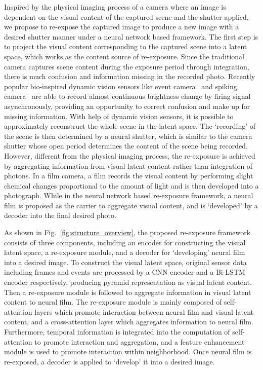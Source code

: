 \documentclass[10pt,twocolumn,letterpaper]{article}
\begin{document}
Inspired by the physical imaging process of a camera where an image is dependent on the visual content of the captured scene and the shutter applied,
we propose to re-expose the captured image to produce a new image with a desired shutter manner under a neural network based framework.
The first step is to project the visual content corresponding to the captured scene into a latent space, which works as the content source of re-exposure. 
Since the traditional camera captures scene content during the exposure period through integration, there is much confusion and information missing in the recorded photo. 
Recently popular bio-inspired dynamic vision sensors like event camera~\cite{EventCmaera-1, EventCamera-2} and spiking camera~\cite{SpikingCamera-1, SpikingCamera-2} are able to record almost continuous brightness change by firing signal asynchronously, providing an opportunity to correct confusion and make up for missing information. 
With help of dynamic vision sensors, it is possible to approximately reconstruct the whole scene
in the latent space. 
The `recording' of the scene is then determined by a neural shutter, which is similar to the camera shutter whose open period determines the content of the scene being recorded.
However, different from the physical imaging process, 
the re-exposure is achieved by aggregating information from visual latent content rather than integration of photons. 
In a film camera, a film records the visual content by performing slight chemical changes proportional to the amount of light and is then developed into a photograph.
While in the neural network based re-exposure framework, a neural film is proposed as the carrier to aggregate visual content, and is `developed' by a decoder into the final desired photo.

As shown in Fig.~\ref{fig:structure_overview}, the proposed re-exposure framework consists of three components, including an encoder for constructing the visual latent space, a re-exposure module, 
and a decoder for `developing' neural film into a desired image. To construct the visual latent space, original sensor data including frames and events are processed by a CNN encoder and a Bi-LSTM encoder respectively, producing pyramid representation as visual latent content. 
Then a re-exposure module is followed to aggregate information in visual latent content to neural film.
The re-exposure module is mainly composed of self-attention layers which promote interaction between neural film and visual latent content, and a cross-attention layer which aggregates information to neural film. Furthermore, temporal information is integrated into the computation of self-attention to promote interaction and aggregation, and a feature enhancement module is used to promote interaction within neighborhood. 
Once neural film is re-exposed, a decoder is applied to `develop' it into a desired image.
\end{document}

